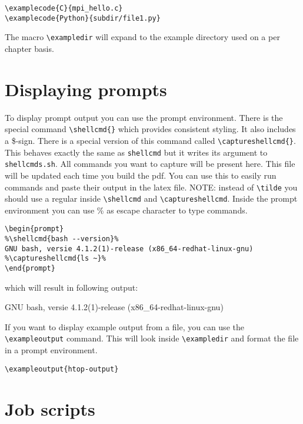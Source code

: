 \documentclass[11pt,a4paper]{article}
\begin{document}
\begin{verbatim}
\examplecode{C}{mpi_hello.c}
\examplecode{Python}{subdir/file1.py}
\end{verbatim}


The macro \verb|\exampledir| will expand to the example directory used on a per
chapter basis.

\section{Displaying prompts}
\label{sec:displaying-prompts}

To display prompt output you can use the prompt environment. There is the
special command \verb|\shellcmd{}| which provides consistent styling. It also
includes a \$-sign. There is a special version of this command called
\verb|\captureshellcmd{}|. This behaves exactly the same as \verb|shellcmd| but
it writes its argument to \verb|shellcmds.sh|. All commands you want to capture
will be present here. This file will be updated each time you build the pdf.
You can use this to easily run commands and paste their output in the latex
file. NOTE: instead of \verb|\tilde| you should use a regular \tilde{} inside
\verb|\shellcmd| and \verb|\captureshellcmd|. Inside the prompt environment you
can use \% as escape character to type commands.

\begin{verbatim}
\begin{prompt}
%\shellcmd{bash --version}%
GNU bash, versie 4.1.2(1)-release (x86_64-redhat-linux-gnu)
%\captureshellcmd{ls ~}%
\end{prompt}
\end{verbatim}

which will result in following output:
\begin{prompt}
GNU bash, versie 4.1.2(1)-release (x86_64-redhat-linux-gnu)
\end{prompt}

If you want to display example output from a file, you can use the
\verb|\exampleoutput| command. This will look inside \verb|\exampledir| and
format the file in a prompt environment.

\begin{verbatim}
\exampleoutput{htop-output}
\end{verbatim}

\section{Job scripts}
\label{sec:job-scripts}
\end{document}
